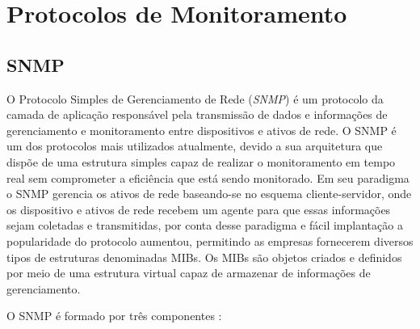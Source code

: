 
\section{Protocolos de Monitoramento}

\subsection{SNMP}

O Protocolo Simples de Gerenciamento de Rede (\textit{\acrlong{SNMP}}) é um protocolo da camada de aplicação responsável pela transmissão de dados e informações de gerenciamento e monitoramento entre dispositivos e ativos de rede. O \acrshort{SNMP} é um dos protocolos mais utilizados atualmente, devido a sua arquitetura que dispõe de uma estrutura simples capaz de realizar o monitoramento em tempo real sem comprometer a eficiência que está sendo monitorado\cite{roohi2014application}. Em seu paradigma o \acrshort{SNMP} gerencia os ativos de rede baseando-se no esquema cliente-servidor, onde os dispositivo e ativos de rede recebem um agente para que essas informações sejam coletadas e transmitidas, por conta desse paradigma e fácil implantação a popularidade do protocolo aumentou, permitindo as empresas fornecerem diversos tipos de estruturas denominadas \acrshort{MIBs}. Os \acrshort{MIBs} são objetos criados e definidos por meio de uma estrutura virtual capaz de armazenar de informações de gerenciamento\cite{roohi2014application,presuhn2002management}.

O \acrshort{SNMP} é formado por três componentes \cite{nadeau2003mpls}:  

